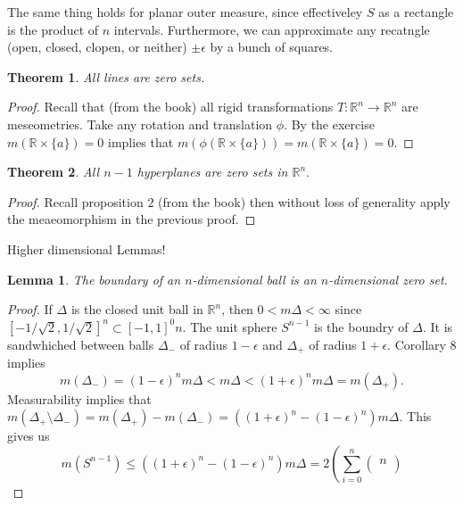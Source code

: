 \documentclass[letter]{article}
\newtheorem{theorem}{Theorem}
\newtheorem{lemma}{Lemma}
\newenvironment{menumerate}{%
  \edef\backupindent{\the\parindent}%
  \enumerate%
  \setlength{\parindent}{\backupindent}%
}{\endenumerate}
\begin{document}
\begin{menumerate}
\begin{menumerate}
		\item The same thing holds for planar outer measure, since effectiveley 
		$S$ as a rectangle is the product of $n$ intervals. Furthermore, we can approximate any recatngle (open, closed, clopen, or neither) $\pm \epsilon$ by a bunch of squares. 
	\end{menumerate}
	\setcounter{enumi}{2}
	\item
	\begin{theorem}
		All lines are zero sets.
	\end{theorem}
	\begin{proof}
		Recall that (from the book) all rigid transformations $T: \mathbb{R}^n \to \mathbb{R}^n$ are meseometries. Take any rotation and translation $\phi.$ By the exercise $m(\mathbb{R} \times \{a\}) = 0$ implies that
		$m(\phi(\mathbb{R} \times  \{a\})) = m(\mathbb{R} \times \{a\}) = 0.$ 
	\end{proof}
	\begin{theorem}
		All $n-1$ hyperplanes are zero sets in $\mathbb{R}^n.$
	\end{theorem}
	\begin{proof}
		Recall proposition $2$ (from the book) then without loss of generality apply the meaeomorphism in the previous proof.
	\end{proof}
	\item Higher dimensional Lemmas!
	\begin{lemma}
		The boundary of an $n$-dimensional ball is an $n$-dimensional zero set.
	\end{lemma}
	\begin{proof}
		If $\Delta$ is the closed unit ball in $\mathbb{R}^n$, then $0 < m\Delta < \infty$ since $[-1/\sqrt{2},1/\sqrt{2}]^n \subset [-1,1]^0n.$ The
		unit sphere $S^{n-1}$ is the boundry of $\Delta.$ It is sandwhiched
		between balls $\Delta_-$ of radius $1 - \epsilon$ and $\Delta_+$ of radius $1+\epsilon.$ Corollary $8$ implies
		\begin{equation}
			m(\Delta_-) = (1- \epsilon)^n m\Delta < m \Delta < (1+ \epsilon)^n m \Delta = m(\Delta_+).	
		\end{equation}
		Measurability implies that $m(\Delta_+ \setminus \Delta_-) = m(\Delta_+) - m(\Delta_-) = ((1 + \epsilon)^n - (1 - \epsilon)^n)m \Delta.$
		This gives us 
		\begin{equation}
			m\left(S^{n-1}\right) \leq ((1 + \epsilon)^n - (1 - \epsilon)^n) m\Delta =2\left(\sum_{i=0}^n \begin{pmatrix}
				n \\

\end{pmatrix}
\end{equation}
\end{proof}
\end{menumerate}
\end{document}
